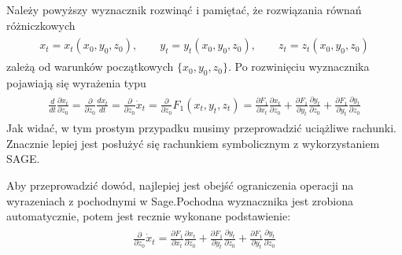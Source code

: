 \documentclass[a4paper,12pt,polish]{sphinxmanual}
\begin{document}
Należy powyższy wyznacznik rozwinąć i pamiętać, że rozwiązania równań różniczkowych
\label{ch1/chI022:equation-eqn29}\begin{gather}
\begin{split}x_t = x_t(x_0, y_0, z_0), \qquad y_t = y_t(x_0, y_0, z_0), \qquad z_t = z_t(x_0, y_0, z_0)\end{split}\label{ch1/chI022-eqn29}
\end{gather}
zależą od warunków początkowych $\{x_0, y_0, z_0\}$.  Po rozwinięciu wyznacznika pojawiają się wyrażenia typu
\label{ch1/chI022:equation-eqn30}\begin{gather}
\begin{split}\frac{d}{dt}  \frac{ \partial x_t}{\partial z_0} = \frac{ \partial }{\partial z_0} \frac{dx_t}{dt} = \frac{ \partial }{\partial z_0} \dot x_t = \frac{ \partial }{\partial z_0} F_1(x_t, y_t, z_t) = \frac{ \partial F_1}{\partial x_t}  \frac{ \partial x_t}{\partial z_0} +  \frac{ \partial F_1}{\partial y_t}  \frac{ \partial y_t}{\partial z_0}  +\frac{ \partial F_1}{\partial y_t}  \frac{ \partial y_t}{\partial z_0}\end{split}\label{ch1/chI022-eqn30}
\end{gather}
Jak widać, w tym prostym przypadku musimy przeprowadzić uciążliwe rachunki. Znacznie lepiej jest posłużyć się rachunkiem symbolicznym z wykorzystaniem SAGE.

Aby przeprowadzić dowód, najlepiej jest obejść  ograniczenia operacji na wyrazeniach z pochodnymi w Sage.Pochodna wyznacznika jest zrobiona automatycznie, potem jest recznie wykonane podstawienie:
\label{ch1/chI022:equation-eqn31}\begin{gather}
\begin{split} \frac{ \partial }{\partial z_0} \dot x_t = \frac{ \partial F_1}{\partial x_t}  \frac{ \partial x_t}{\partial z_0} +  \frac{ \partial F_1}{\partial y_t}  \frac{ \partial y_t}{\partial z_0}  +\frac{ \partial F_1}{\partial y_t}  \frac{ \partial y_t}{\partial z_0}\end{split}\label{ch1/chI022-eqn31}
\end{gather}
\end{document}
